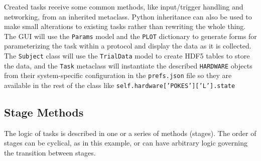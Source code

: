 Created tasks receive some common methods, like input/trigger handling and networking, from an inherited metaclass. Python inheritance can also be used to make small alterations to existing tasks rather than rewriting the whole thing. The GUI will use the \texttt{Params} model and the \texttt{PLOT} dictionary to generate forms for parameterizing the task within a protocol and display the data as it is collected. The \texttt{Subject} class will use the \texttt{TrialData} model to create HDF5 tables to store the data, and the \texttt{Task} metaclass will instantiate the described \texttt{HARDWARE} objects from their system-specific configuration in the \texttt{prefs.json} file so they are available in the rest of the class like \texttt{self.hardware['POKES']['L'].state}

\subsection{Stage Methods}

The logic of tasks is described in one or a series of methods (stages). The order of stages can be cyclical, as in this example, or can have arbitrary logic governing the transition between stages.

